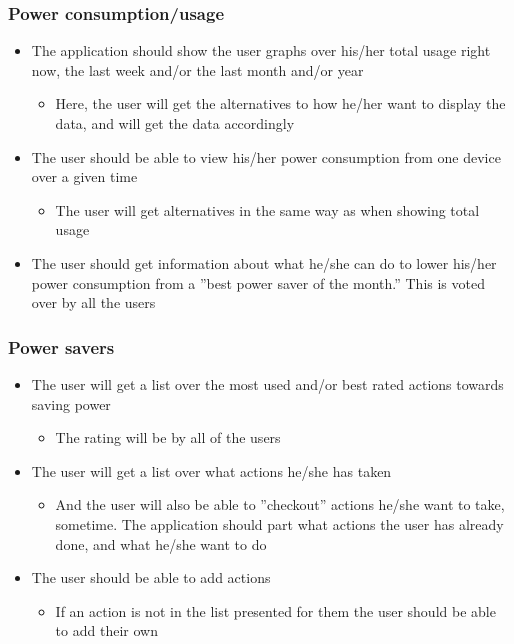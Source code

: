 \subsubsection{Power consumption/usage}
\begin{itemize}
\item The application should show the user graphs over his/her total usage right now, the last week and/or the last month and/or year
\begin{itemize}
\item Here, the user will get the alternatives to how he/her want to display the data, and will get the data accordingly
\end{itemize}
\item The user should be able to view his/her power consumption from one device over a given time
\begin{itemize}
\item The user will get alternatives in the same way as when showing total usage
\end{itemize}
\item The user should get information about what he/she can do to lower his/her power consumption from a ''best power saver of the month.'' This is voted over by all the users
\end{itemize}

\subsubsection{Power savers}

\begin{itemize}
\item The user will get a list over the most used and/or best rated actions towards saving power
\begin{itemize}
\item The rating will be by all of the users
\end{itemize}
\item The user will get a list over what actions he/she has taken
\begin{itemize}
\item And the user will also be able to ''checkout'' actions he/she want to take, sometime. The application should part what actions the user has already done, and what he/she want to do
\end{itemize}
\item The user should be able to add actions
\begin{itemize}
\item If an action is not in the list presented for them the user should be able to add their own
\end{itemize}
\end{itemize}


